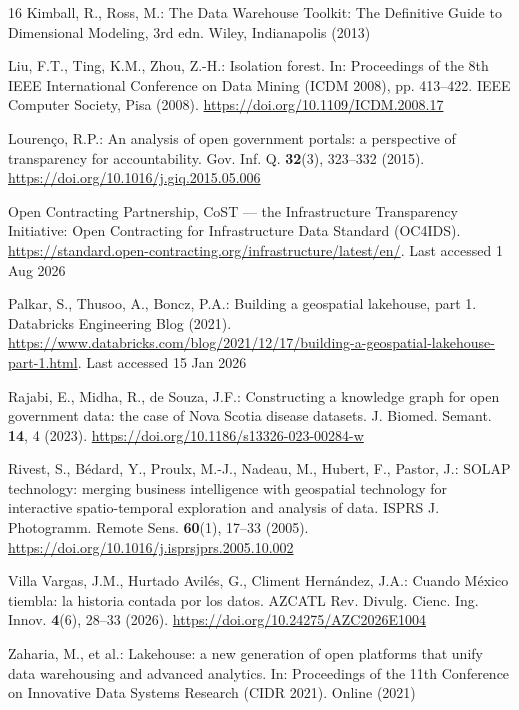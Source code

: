 \documentclass[runningheads]{llncs}
\renewcommand{\_}{\origunderscore\allowbreak}
\begin{document}
\begin{thebibliography}{16}
Kimball, R., Ross, M.: The Data Warehouse Toolkit: The Definitive Guide to Dimensional Modeling, 3rd edn. Wiley, Indianapolis (2013)

Liu, F.T., Ting, K.M., Zhou, Z.-H.: Isolation forest. In: Proceedings of the 8th IEEE International Conference on Data Mining (ICDM 2008), pp. 413--422. IEEE Computer Society, Pisa (2008). \url{https://doi.org/10.1109/ICDM.2008.17}

Louren\c{c}o, R.P.: An analysis of open government portals: a perspective of transparency for accountability. Gov. Inf. Q. \textbf{32}(3), 323--332 (2015). \url{https://doi.org/10.1016/j.giq.2015.05.006}

Open Contracting Partnership, CoST --- the Infrastructure Transparency Initiative: Open Contracting for Infrastructure Data Standard (OC4IDS). \url{https://standard.open-contracting.org/infrastructure/latest/en/}. Last accessed 1 Aug 2026

Palkar, S., Thusoo, A., Boncz, P.A.: Building a geospatial lakehouse, part 1. Databricks Engineering Blog (2021). \url{https://www.databricks.com/blog/2021/12/17/building-a-geospatial-lakehouse-part-1.html}. Last accessed 15 Jan 2026

Rajabi, E., Midha, R., de Souza, J.F.: Constructing a knowledge graph for open government data: the case of Nova Scotia disease datasets. J. Biomed. Semant. \textbf{14}, 4 (2023). \url{https://doi.org/10.1186/s13326-023-00284-w}

Rivest, S., B\'edard, Y., Proulx, M.-J., Nadeau, M., Hubert, F., Pastor, J.: SOLAP technology: merging business intelligence with geospatial technology for interactive spatio-temporal exploration and analysis of data. ISPRS J. Photogramm. Remote Sens. \textbf{60}(1), 17--33 (2005). \url{https://doi.org/10.1016/j.isprsjprs.2005.10.002}

Villa Vargas, J.M., Hurtado Avil\'es, G., Climent Hern\'andez, J.A.: Cuando M\'exico tiembla: la historia contada por los datos. AZCATL Rev. Divulg. Cienc. Ing. Innov. \textbf{4}(6), 28--33 (2026). \url{https://doi.org/10.24275/AZC2026E1004}

Zaharia, M., et al.: Lakehouse: a new generation of open platforms that unify data warehousing and advanced analytics. In: Proceedings of the 11th Conference on Innovative Data Systems Research (CIDR 2021). Online (2021)

\end{thebibliography}\endgroup
\end{document}

